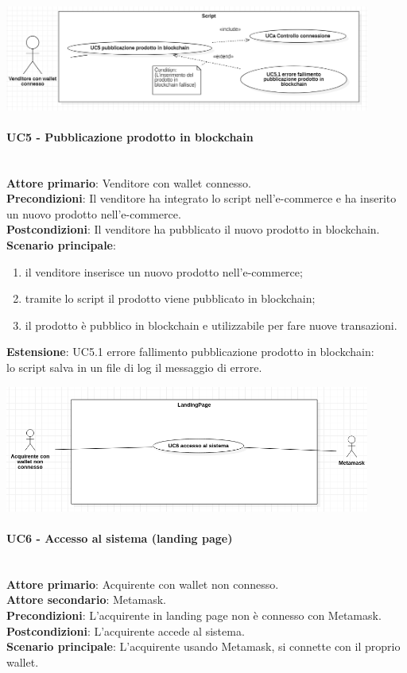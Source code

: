 \documentclass[a4paper, 12pt]{article}
\begin{document}
\includegraphics[width=0.9\textwidth]{UC_script}

\paragraph{UC5 - Pubblicazione prodotto in blockchain}\\
\textbf{Attore primario}: Venditore con wallet connesso.\\
\textbf{Precondizioni}: Il venditore ha integrato lo script nell'e-commerce e ha inserito un nuovo prodotto nell'e-commerce.\\
\textbf{Postcondizioni}: Il venditore ha pubblicato il nuovo prodotto in blockchain.\\
\textbf{Scenario principale}:
\begin{enumerate}
    \item il venditore inserisce un nuovo prodotto nell'e-commerce;
    \item tramite lo script il prodotto viene pubblicato in blockchain;
    \item il prodotto è pubblico in blockchain e utilizzabile per fare nuove transazioni.
\end{enumerate}
\textbf{Estensione}:
UC5.1 errore fallimento pubblicazione prodotto in blockchain:\\
lo script salva in un file di log il messaggio di errore.


\includegraphics[width=0.9\textwidth]{UC_LP1}

\paragraph{UC6 - Accesso al sistema (landing page)}\\
\textbf{Attore primario}: Acquirente con wallet non connesso.\\
\textbf{Attore secondario}: Metamask.\\
\textbf{Precondizioni}: L'acquirente in landing page non è connesso con Metamask.\\
\textbf{Postcondizioni}: L'acquirente accede al sistema.\\
\textbf{Scenario principale}:
L'acquirente usando Metamask, si connette con il proprio wallet.
\end{document}
